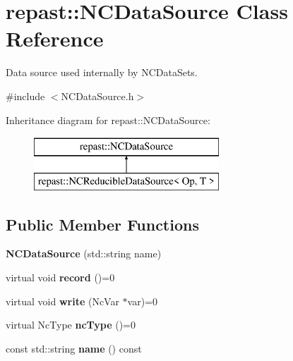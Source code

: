 \hypertarget{classrepast_1_1_n_c_data_source}{\section{repast\-:\-:N\-C\-Data\-Source Class Reference}
\label{classrepast_1_1_n_c_data_source}
}


Data source used internally by N\-C\-Data\-Sets.  




{\ttfamily \#include $<$N\-C\-Data\-Source.\-h$>$}

Inheritance diagram for repast\-:\-:N\-C\-Data\-Source\-:\begin{figure}[H]
\begin{center}
\leavevmode
\includegraphics[height=2.000000cm]{classrepast_1_1_n_c_data_source}
\end{center}
\end{figure}
\subsection*{Public Member Functions}
\begin{DoxyCompactItemize}
\item 
\hypertarget{classrepast_1_1_n_c_data_source_a1f7164f8187259412de1bcba13e715f7}{{\bfseries N\-C\-Data\-Source} (std\-::string name)}\label{classrepast_1_1_n_c_data_source_a1f7164f8187259412de1bcba13e715f7}

\item 
\hypertarget{classrepast_1_1_n_c_data_source_a7c698d7661ed5d0c05c47bf9f0fc85f4}{virtual void {\bfseries record} ()=0}\label{classrepast_1_1_n_c_data_source_a7c698d7661ed5d0c05c47bf9f0fc85f4}

\item 
\hypertarget{classrepast_1_1_n_c_data_source_acd388166a86f69d483294a6180659a6c}{virtual void {\bfseries write} (Nc\-Var $\ast$var)=0}\label{classrepast_1_1_n_c_data_source_acd388166a86f69d483294a6180659a6c}

\item 
\hypertarget{classrepast_1_1_n_c_data_source_a63c2afe61362c76b2158a01ff316dc75}{virtual Nc\-Type {\bfseries nc\-Type} ()=0}\label{classrepast_1_1_n_c_data_source_a63c2afe61362c76b2158a01ff316dc75}

\item 
\hypertarget{classrepast_1_1_n_c_data_source_a73dafa85a05b1b8ed5000cc7b288e8e1}{const std\-::string {\bfseries name} () const }\label{classrepast_1_1_n_c_data_source_a73dafa85a05b1b8ed5000cc7b288e8e1}

\end{DoxyCompactItemize}
